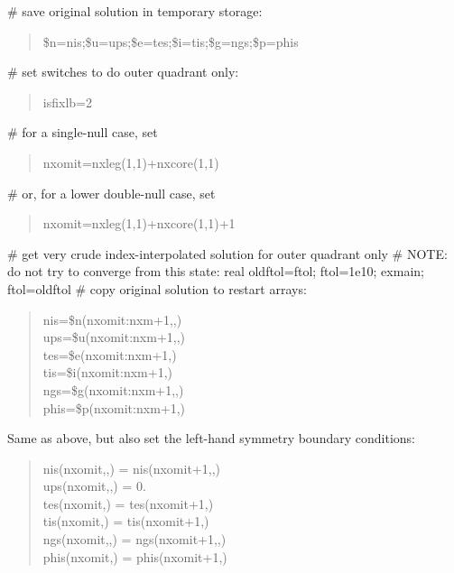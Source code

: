 \documentclass [12pt]{article}
\def\hsa{\hskip.4truein}
\begin{document}
\# save original solution in temporary storage:
\begin{verse} \sf
        \$n=nis;\$u=ups;\$e=tes;\$i=tis;\$g=ngs;\$p=phis
\end{verse}
\# set switches to do outer quadrant only:
\begin{verse} \sf
        isfixlb=2
\end{verse}
\# for a single-null case, set
\begin{verse} \sf
        nxomit=nxleg(1,1)+nxcore(1,1)
\end{verse}
\# or, for a lower double-null case, set
\begin{verse} \sf
        nxomit=nxleg(1,1)+nxcore(1,1)+1
\end{verse}
\# get very crude index-interpolated solution for outer quadrant only
\# NOTE: do not try to converge from this state:
        {\sf real oldftol=ftol; ftol=1e10; exmain; ftol=oldftol}
\# copy original solution to restart arrays:
\begin{verse} \sf
        nis=\$n(nxomit:nxm+1,,)\\
        ups=\$u(nxomit:nxm+1,,)\\
        tes=\$e(nxomit:nxm+1,)\\
        tis=\$i(nxomit:nxm+1,)\\
        ngs=\$g(nxomit:nxm+1,,)\\
        phis=\$p(nxomit:nxm+1,)
\end{verse}
 

Same as above, but also set the left-hand symmetry boundary conditions:
\begin{verse} \sf
        nis(nxomit,,) = nis(nxomit+1,,)\\
        ups(nxomit,,) = 0.\\
        tes(nxomit,) = tes(nxomit+1,)\\
        tis(nxomit,) = tis(nxomit+1,)\\
        ngs(nxomit,,) = ngs(nxomit+1,,)\\
        phis(nxomit,) = phis(nxomit+1,)\\
\end{verse}
{\sf
{}
}
\end{document}
